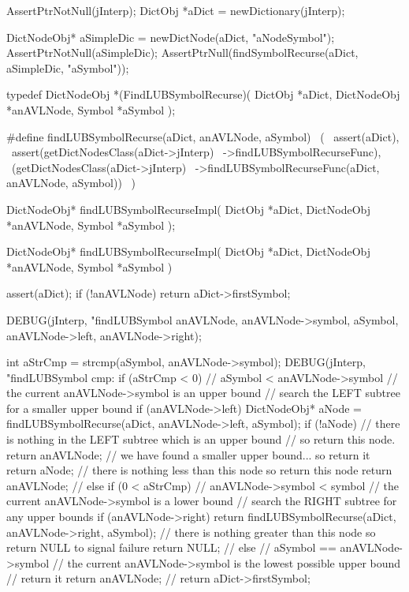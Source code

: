 \startCTest
  AssertPtrNotNull(jInterp);
  DictObj *aDict = newDictionary(jInterp);

  DictNodeObj* aSimpleDic = newDictNode(aDict, "aNodeSymbol");
  AssertPtrNotNull(aSimpleDic);
  AssertPtrNull(findSymbolRecurse(aDict, aSimpleDic, "aSymbol"));
\stopCTest
\stopTestCase
\stopTestSuite

\startTestSuite[findLUBSymbolRecurse]

\startCHeader
typedef DictNodeObj *(FindLUBSymbolRecurse)(
  DictObj     *aDict,
  DictNodeObj *anAVLNode,
  Symbol      *aSymbol
);

#define findLUBSymbolRecurse(aDict, anAVLNode, aSymbol)       \
  (                                                           \
    assert(aDict),                                            \
    assert(getDictNodesClass(aDict->jInterp)                  \
      ->findLUBSymbolRecurseFunc),                            \
    (getDictNodesClass(aDict->jInterp)                        \
      ->findLUBSymbolRecurseFunc(aDict, anAVLNode, aSymbol))  \
  )
\stopCHeader

\setCHeaderStream{private}
\startCHeader
DictNodeObj* findLUBSymbolRecurseImpl(
  DictObj     *aDict,
  DictNodeObj *anAVLNode,
  Symbol      *aSymbol
);
\stopCHeader
{}

\startCCode
DictNodeObj* findLUBSymbolRecurseImpl(
  DictObj     *aDict,
  DictNodeObj *anAVLNode,
  Symbol      *aSymbol
) {
  assert(aDict);
  if (!anAVLNode) return aDict->firstSymbol;

  DEBUG(jInterp, "findLUBSymbol %
        anAVLNode, anAVLNode->symbol, aSymbol,
        anAVLNode->left, anAVLNode->right);

  int aStrCmp = strcmp(aSymbol, anAVLNode->symbol);
  DEBUG(jInterp, "findLUBSymbol cmp: %
  if (aStrCmp < 0) {
    // aSymbol < anAVLNode->symbol
    // the current anAVLNode->symbol is an upper bound
    // search the LEFT subtree for a smaller upper bound
    if (anAVLNode->left) {
      DictNodeObj* aNode = findLUBSymbolRecurse(aDict, anAVLNode->left, aSymbol);
      if (!aNode) {
        // there is nothing in the LEFT subtree which is an upper bound
        // so return this node.
        return anAVLNode;
      }
      // we have found a smaller upper bound... so return it
      return aNode;
    }
    // there is nothing less than this node so return this node
    return anAVLNode;
    //
  } else if (0 < aStrCmp) {
    // anAVLNode->symbol < symbol
    // the current anAVLNode->symbol is a lower bound
    // search the RIGHT subtree for any upper bounds
    if (anAVLNode->right) {
      return findLUBSymbolRecurse(aDict, anAVLNode->right, aSymbol);
    }
    // there is nothing greater than this node so return NULL to signal failure
    return NULL;
    //
  } else {
    // aSymbol == anAVLNode->symbol
    // the current anAVLNode->symbol is the lowest possible upper bound
    // return it
    return anAVLNode;
    //
  }
  return aDict->firstSymbol;
}
\stopCCode
\stopTestSuite
